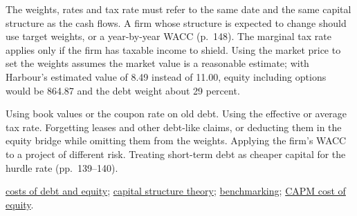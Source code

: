 \begin{qfmethod}
 The weights, rates and tax rate must refer to the same date and the same capital structure as the cash flows. A firm whose structure is expected to change should use target weights, or a year-by-year WACC (p.~148). The marginal tax rate applies only if the firm has taxable income to shield. Using the market price to set the weights assumes the market value is a reasonable estimate; with Harbour's estimated value of 8.49 instead of 11.00, equity including options would be 864.87 and the debt weight about 29 percent.

 Using book values or the coupon rate on old debt. Using the effective or average tax rate. Forgetting leases and other debt-like claims, or deducting them in the equity bridge while omitting them from the weights. Applying the firm's WACC to a project of different risk. Treating short-term debt as cheaper capital for the hurdle rate (pp.~139--140).

 \hyperref[meth:cost-of-debt-equity-estimation]{costs of debt and equity}; \hyperref[mod:capital-structure-theory]{capital structure theory}; \hyperref[meth:capital-structure-benchmarking]{benchmarking}; \hyperref[meth:required-return-on-equity]{CAPM cost of equity}.

\end{qfmethod}

